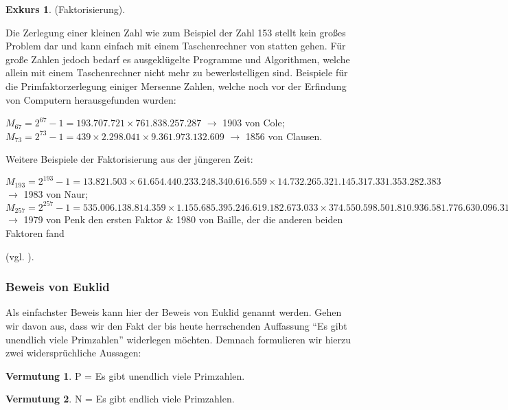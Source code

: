 \documentclass[12pt,a4paper]{article}
\theoremstyle{definition}
\newtheorem{vermutung}{Vermutung}[subsection]
\newtheorem{exkurs}{Exkurs}
\begin{document}
\begin{exkurs}(Faktorisierung).
\par\begingroup\leftskip=0.5cm\rightskip=0.5cm\noindent
Die Zerlegung einer kleinen Zahl wie zum Beispiel der Zahl 153 stellt kein großes Problem dar und kann einfach mit einem Taschenrechner von statten gehen.
Für große Zahlen jedoch bedarf es ausgeklügelte Programme und Algorithmen, welche allein mit einem Taschenrechner nicht mehr zu bewerkstelligen sind.\newline
Beispiele für die Primfaktorzerlegung einiger Mersenne Zahlen, welche noch vor der Erfindung von Computern herausgefunden wurden:
\begin{center}
$M_{67} = 2^{67}-1 = 193.707.721\times761.838.257.287$ $\rightarrow$ 1903 von Cole;\\
$M_{73} = 2^{73}-1 = 439\times2.298.041\times9.361.973.132.609$ $\rightarrow$ 1856 von Clausen.\\
\end{center}
Weitere Beispiele der Faktorisierung aus der jüngeren Zeit:
\begin{center}
$M_{193} = 2^{193}-1 = 13.821.503\times61.654.440.233.248.340.616.559\times14.732.265.321.145.317.331.353.282.383$ $\rightarrow$ 1983 von Naur;\\
$M_{257} = 2^{257}-1 = 535.006.138.814.359\times1.155.685.395.246.619.182.673.033\times374.550.598.501.810.936.581.776.630.096.313.181.393$ $\rightarrow$ 1979 von Penk den ersten Faktor \& 1980 von Baille, der die anderen beiden Faktoren fand\end{center} (vgl. \cite[125--128]{Ribenboim2006}).
\par
\endgroup
\end{exkurs}

\subsubsection{Beweis von Euklid}\label{Beweis von Euklid}
Als einfachster Beweis kann hier der Beweis von Euklid genannt werden.
Gehen wir davon aus, dass wir den Fakt der bis heute herrschenden Auffassung “Es gibt unendlich viele Primzahlen” widerlegen möchten.
Demnach formulieren wir hierzu zwei widersprüchliche Aussagen:
\begin{vermutung} P = Es gibt unendlich viele Primzahlen.\end{vermutung}
\begin{vermutung}\label{vermutung} N = Es gibt endlich viele Primzahlen.\end{vermutung}
\end{document}
